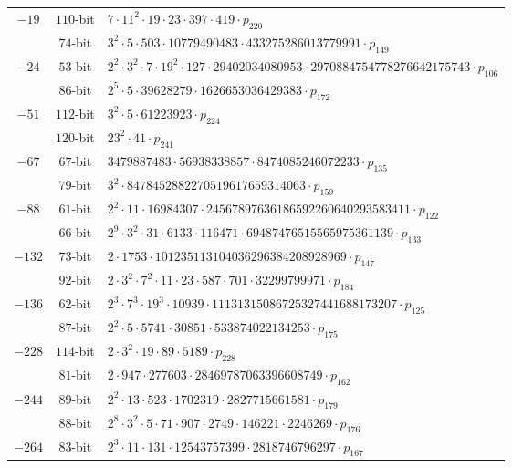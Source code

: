 \documentclass{amsart}
\begin{document}
\begin{table*}[!ht]
\begin{tabularx}{\textwidth}{ccl}
$-19$ & $110$-bit & $7  \cdot 11^{2}  \cdot 19  \cdot 23  \cdot 397  \cdot 419  \cdot p_{220}$\\
 & $74$-bit & $3^{2}  \cdot 5  \cdot 503  \cdot 10779490483  \cdot 433275286013779991  \cdot p_{149}$\\
$-24$ & $53$-bit & $2^{2}  \cdot 3^{2}  \cdot 7  \cdot 19^{2}  \cdot 127  \cdot 29402034080953  \cdot 2970884754778276642175743  \cdot p_{106}$\\
 & $86$-bit & $2^{5}  \cdot 5  \cdot 39628279  \cdot 1626653036429383  \cdot p_{172}$\\
$-51$ & $112$-bit & $3^{2}  \cdot 5  \cdot 61223923  \cdot p_{224}$\\
 & $120$-bit & $23^{2}  \cdot 41  \cdot p_{241}$\\
$-67$ & $67$-bit & $3479887483  \cdot 56938338857  \cdot 8474085246072233  \cdot p_{135}$\\
 & $79$-bit & $3^{2}  \cdot 8478452882270519617659314063  \cdot p_{159}$\\
$-88$ & $61$-bit & $2^{2}  \cdot 11  \cdot 16984307  \cdot 24567897636186592260640293583411  \cdot p_{122}$\\
 & $66$-bit & $2^{9}  \cdot 3^{2}  \cdot 31  \cdot 6133  \cdot 116471  \cdot 69487476515565975361139  \cdot p_{133}$\\
$-132$ & $73$-bit & $2  \cdot 1753  \cdot 101235113104036296384208928969  \cdot p_{147}$\\
 & $92$-bit & $2  \cdot 3^{2}  \cdot 7^{2}  \cdot 11  \cdot 23  \cdot 587  \cdot 701  \cdot 32299799971  \cdot p_{184}$\\
$-136$ & $62$-bit & $2^{3}  \cdot 7^{3}  \cdot 19^{3}  \cdot 10939  \cdot 11131315086725327441688173207  \cdot p_{125}$\\
 & $87$-bit & $2^{2}  \cdot 5  \cdot 5741  \cdot 30851  \cdot 533874022134253  \cdot p_{175}$\\
$-228$ & $114$-bit & $2  \cdot 3^{2}  \cdot 19  \cdot 89  \cdot 5189  \cdot p_{228}$\\
 & $81$-bit & $2  \cdot 947  \cdot 277603  \cdot 28469787063396608749  \cdot p_{162}$\\
$-244$ & $89$-bit & $2^{2}  \cdot 13  \cdot 523  \cdot 1702319  \cdot 2827715661581  \cdot p_{179}$\\
 & $88$-bit & $2^{8}  \cdot 3^{2}  \cdot 5  \cdot 71  \cdot 907  \cdot 2749  \cdot 146221  \cdot 2246269  \cdot p_{176}$\\
$-264$ & $83$-bit & $2^{3}  \cdot 11  \cdot 131  \cdot 12543757399  \cdot 2818746796297  \cdot p_{167}$\\

\end{tabularx}
\end{table*}
\end{document}
